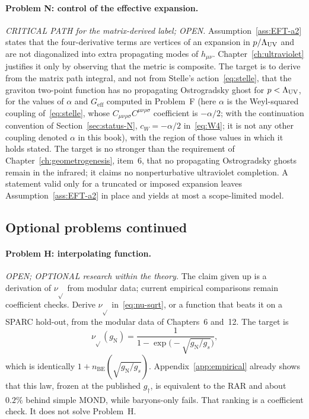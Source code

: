 \paragraph{Problem N: control of the effective expansion.}
\emph{CRITICAL PATH for the matrix-derived label; OPEN.}
Assumption~\ref{ass:EFT-a2} states that the four-derivative terms are
vertices of an expansion in \(p/\Lambda_{\mathrm{UV}}\) and are not diagonalized into
extra propagating modes of \(h_{\mu\nu}\). Chapter~\ref{ch:ultraviolet}
justifies it only by observing that the metric is composite. The
target is to derive from the matrix path integral, and not from
Stelle's action~\eqref{eq:stelle}, that the graviton two-point
function has no propagating Ostrogradsky ghost for \(p<\Lambda_{\mathrm{UV}}\), for
the values of \(\alpha\) and \(G_{\mathrm{eff}}\) computed in Problem~F (here \(\alpha\) is the Weyl-squared coupling
of~\eqref{eq:stelle}, whose \(C_{\mu\nu\rho\sigma}C^{\mu\nu\rho\sigma}\)
coefficient is \(-\alpha/2\); with the continuation convention of
Section~\ref{sec:status-N}, \(c_W=-\alpha/2\) in~\eqref{eq:W4}; it is
not any other coupling denoted \(\alpha\) in this book), with the region of those values in which it holds stated.
The target is no stronger than the requirement of
Chapter~\ref{ch:geometrogenesis}, item~6, that no propagating
Ostrogradsky ghosts remain in the infrared; it claims no
nonperturbative ultraviolet completion. A statement valid only for a
truncated or imposed expansion leaves Assumption~\ref{ass:EFT-a2} in
place and yields at most a scope-limited model.

\subsection{Optional problems continued}

\paragraph{Problem H: interpolating function.}
\emph{OPEN; OPTIONAL research within the theory.} The claim given
up is a derivation of \(\nu_{\sqrt{}}\) from modular data; current
empirical comparisons remain coefficient checks.
Derive \(\nu_{\sqrt{}}\) in~\eqref{eq:nu-sqrt}, or a function
that beats it on a SPARC hold-out, from the modular data of
Chapters~6 and~12. The target is
\begin{equation}
  \label{eq:nu-target}
  \nu_{\sqrt{}}(g_{\mathrm{N}})
  =\frac{1}{1-\exp\bigl(-\sqrt{g_{\mathrm{N}}/g_s}\bigr)},
\end{equation}
which is identically \(1+n_{\mathrm{BE}}(\sqrt{g_{\mathrm{N}}/g_s})\).
Appendix~\ref{app:empirical} already shows that this law, frozen
at the published \(g_\dagger\), is equivalent to the RAR and
about \(0.2\%\) behind simple MOND, while baryons-only fails.
That ranking is a coefficient check. It does not solve
Problem~H.

